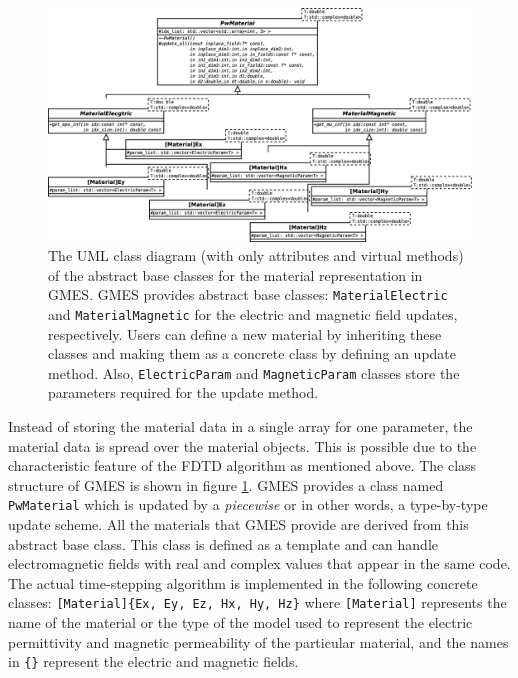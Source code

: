 \begin{figure}[hp!]
  \centering
  \includegraphics[keepaspectratio,width=1\textwidth]{figure/pw_material}
  \caption{The UML class diagram (with only attributes and virtual methods) of the abstract base classes for the material representation in GMES. GMES provides abstract base classes: \texttt{MaterialElectric} and \texttt{MaterialMagnetic} for the electric and magnetic field updates, respectively. Users can define a new material by inheriting these classes and making them as a concrete class by defining an update method. Also, \texttt{ElectricParam} and \texttt{MagneticParam} classes store the parameters required for the update method.}
  \label{fig:pwmaterial}
\end{figure}

Instead of storing the material data in a single array for one parameter, the material data is spread over the material objects. This is possible due to the characteristic feature of the FDTD algorithm as mentioned above. The class structure of GMES is shown in figure \ref{fig:pwmaterial}. GMES provides a class named \texttt{PwMaterial} which is updated by a \emph{piecewise} or in other words, a type-by-type update scheme. All the materials that GMES provide are derived from this abstract base class. This class is defined as a template and can handle electromagnetic fields with real and complex values that appear in the same code. The actual time-stepping algorithm is implemented in the following concrete classes: \texttt{[Material]\{Ex, Ey, Ez, Hx, Hy, Hz\}} where \texttt{[Material]} represents the name of the material or the type of the model used to represent the electric permittivity and magnetic permeability of the particular material, and  the names in \texttt{\{\}} represent the electric and magnetic fields. 

